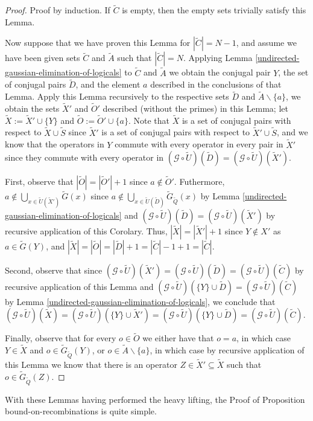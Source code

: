 \documentclass[twocolumn,showpacs,preprintnumbers,amsmath,amssymb,nofootinbib,pra,floatfix]{revtex4-1}
\newcommand{\set}{\tilde}
\newcommand{\genfun}{\mathcal{G}}
\begin{document}
\begin{proof}
Proof by induction.  If $\set C$ is empty, then the empty sets trivially satisfy this Lemma.

Now suppose that we have proven this Lemma for $|\set C|=N-1$, and assume we have been given sets $\set C$ and $\set A$ such that $|\set C|=N$.  Applying Lemma \ref{undirected-gaussian-elimination-of-logicals} to $\set C$ and $\set A$ we obtain the conjugal pair $Y$,  the set of conjugal pairs $\set D$, and the element $a$ described in the conclusions of that Lemma.  Apply this Lemma recursively to the respective sets $\set D$ and $\set A\backslash\{a\}$, we obtain the sets $\set X'$ and $\set O'$ described (without the primes) in this Lemma; let $\set X := \set X'\cup\{Y\}$ and $\set O:=\set O'\cup\{a\}$.  Note that $\set X$ is a set of conjugal pairs with respect to $\set X\cup\set S$ since $\set X'$ is a set of conjugal pairs with respect to $\set X'\cup\set S$, and we know that the operators in $Y$ commute with every operator in every pair in $\set X'$ since they commute with every operator in $(\genfun\circ\set U)(\set D)=(\genfun\circ\set U)(\set X')$.

First, observe that $|\set O|=|\set O'|+1$ since $a\notin \set O'$.  Futhermore, $a\notin \bigcup_{x\in \set U(\set X')} \set G(x)$ since $a\notin \bigcup_{x\in \set U(\set D)} \set G_{\set Q}(x)$ by Lemma \ref{undirected-gaussian-elimination-of-logicals} and $(\genfun\circ\set U)(\set D)=(\genfun\circ\set U)(\set X')$ by recursive application of this Corolary.  Thus, $|\set X|=|\set X'|+1$ since $Y\notin X'$ as $a\in\set G(Y)$, and $|\set X|=|\set O|=|\set D|+1=|\set C|-1+1=|\set C|$.

Second, observe that since $(\genfun\circ\set U)(\set X')=(\genfun\circ\set U)(\set D)=(\genfun\circ\set U)(\set C)$ by recursive application of this Lemma and $(\genfun\circ\set U)(\{Y\}\cup\set D)=(\genfun\circ\set U)(\set C)$ by Lemma \ref{undirected-gaussian-elimination-of-logicals}, we conclude that $(\genfun\circ\set U)(\set X) = (\genfun\circ\set U)(\{Y\}\cup\set X') = (\genfun\circ\set U)(\{Y\}\cup\set D) = (\genfun\circ\set U)(\set C)$.

Finally, observe that for every $o\in\set O$ we either have that $o=a$, in which case $Y\in\set X$ and $o\in\set G_{\set Q}(Y)$, or $o\in \set A\backslash\{a\}$, in which case by recursive application of this Lemma we know that there is an operator $Z\in \set X'\subseteq \set X$ such that $o\in\set G_{\set Q}(Z)$.
\end{proof}
With these Lemmas having performed the heavy lifting, the Proof of Proposition {bound-on-recombinations} is quite simple.
\end{document}
